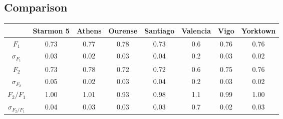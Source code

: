 \documentclass[11pt]{article}
\begin{document}
\subsection{Comparison}
\begin{table}[H]
    \centering
    \begin{tabular}{|c|c|c|c|c|c|c|c|}
    \hline
    \textbf{} & \textbf{Starmon 5} & \textbf{Athens} & \textbf{Ourense} & \textbf{Santiago} & \textbf{Valencia} & \textbf{Vigo} & \textbf{Yorktown} \\ \hline
    $F_1$              & 0.73 & 0.77 & 0.78 & 0.73 & 0.6 & 0.76 & 0.76 \\ \hline
    $\sigma_{F_1}$     & 0.03 & 0.02 & 0.03 & 0.04 & 0.2 & 0.03 & 0.02 \\ \hline
    $F_2$              & 0.73 & 0.78 & 0.72 & 0.72 & 0.6 & 0.75 & 0.76 \\ \hline
    $\sigma_{F_2}$     & 0.05 & 0.02 & 0.03 & 0.04 & 0.2 & 0.03 & 0.02 \\ \hline
    $F_2/F_1$          & 1.00 & 1.01 & 0.93 & 0.98 & 1.1 & 0.99 & 1.00 \\ \hline
    $\sigma_{F_2/F_1}$ & 0.04 & 0.03 & 0.03 & 0.03 & 0.7 & 0.02 & 0.03 \\ \hline
    \end{tabular}
    \end{table}
\end{document}
